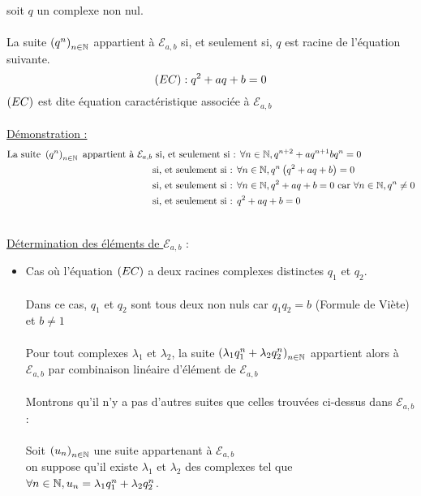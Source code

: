 \begin{dem}
\begin{enumerate}
            soit \(q\) un complexe non nul. \\~\\
            La suite \(\left(q^n\right)_{n\in \mathbb{N}} \) appartient à \(\mathcal{E}_{a,b}\) si, et seulement si, \(q\) est racine de l'équation suivante.
            \[\left(EC\right) : q^2 + aq+b=0\]
            \(\left(EC\right)\) est dite équation caractéristique associée à \(\mathcal{E}_{a,b}\)\\~\\
            \underline{Démonstration :}
            \begin{align*}
            \text{La suite }\left(q^n\right)_{n \in \mathbb{N}}\text{ appartient à }\mathcal{E}_{a,b} &\text{ si, et seulement si : } \forall n \in \mathbb{N}, q^{n+2} + a q^{n+1} b q^n =0 \\
            &\text{si, et seulement si : } \forall n \in \mathbb{N},q^n\left(q^2 + aq +b\right) =0 \\
            &\text{si, et seulement si : } \forall n \in \mathbb{N}, q^2 +aq+b =0 \text{ car } \forall n \in \mathbb{N},q^n \neq 0\\
            &\text{si, et seulement si : } q^2 + aq +b =0
            \end{align*}
    \end{enumerate}
    ~\\
    \underline{Détermination des éléments de \(\mathcal{E}_{a,b}\)} : \\
    \begin{itemize}
        \item Cas où l'équation \(\left(EC\right)\) a deux racines complexes distinctes \(q_1\) et \(q_2\).\\~\\
        Dans ce cas, \(q_1\) et \(q_2\) sont tous deux non nuls car \(q_1 q_2 = b\) (Formule de Viète) et \(b\neq 1\)\\~\\
        Pour tout complexes \(\lambda_1\) et \(\lambda_2\), la suite \(\left(\lambda_1 q_1^n + \lambda_2q_2^n\right)_{n \in \mathbb{N}}\) appartient alors à \(\mathcal{E}_{a,b}\) par combinaison linéaire d'élément de \(\mathcal{E}_{a,b}\) \\~\\
        Montrons qu'il n'y a pas d'autres suites que celles trouvées ci-dessus dans \(\mathcal{E}_{a,b}\) : \\~\\
        Soit \(\left(u_n\right)_{n \in \mathbb{N}}\) une suite appartenant à \(\mathcal{E}_{a,b}\)\\
        \analyse 
        on suppose qu'il existe \(\lambda_1\) et \(\lambda_2\) des complexes tel que \(\forall n \in \mathbb{N}, u_n = \lambda_1 q_1^n + \lambda_2 q_2^n\). \\

\end{itemize}
\end{dem}
